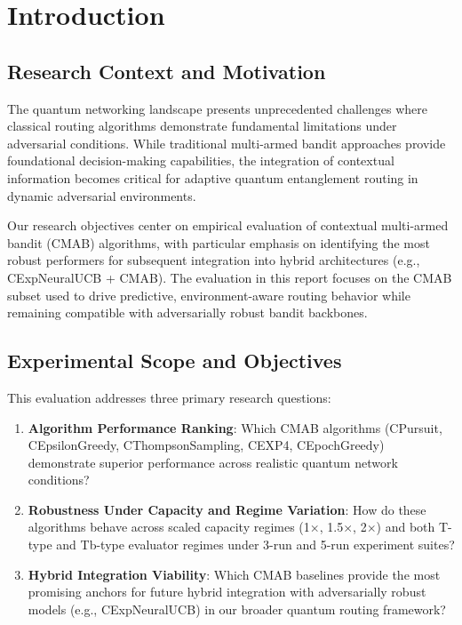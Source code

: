 \documentclass[12pt,a4paper]{article}
\begin{document}
\newpage
\section{Introduction}

\subsection{Research Context and Motivation}

The quantum networking landscape presents unprecedented challenges where classical routing algorithms demonstrate fundamental limitations under adversarial conditions. While traditional multi-armed bandit approaches provide foundational decision-making capabilities, the integration of contextual information becomes critical for adaptive quantum entanglement routing in dynamic adversarial environments.

Our research objectives center on empirical evaluation of contextual multi-armed bandit (CMAB) algorithms, with particular emphasis on identifying the most robust performers for subsequent integration into hybrid architectures (e.g., CExpNeuralUCB + CMAB). The evaluation in this report focuses on the CMAB subset used to drive predictive, environment-aware routing behavior while remaining compatible with adversarially robust bandit backbones.

\subsection{Experimental Scope and Objectives}

This evaluation addresses three primary research questions:

\begin{enumerate}
\item \textbf{Algorithm Performance Ranking}: Which CMAB algorithms (CPursuit, CEpsilonGreedy, CThompsonSampling, CEXP4, CEpochGreedy) demonstrate superior performance across realistic quantum network conditions?
\item \textbf{Robustness Under Capacity and Regime Variation}: How do these algorithms behave across scaled capacity regimes (1$\times$, 1.5$\times$, 2$\times$) and both T-type and Tb-type evaluator regimes under 3-run and 5-run experiment suites?
\item \textbf{Hybrid Integration Viability}: Which CMAB baselines provide the most promising anchors for future hybrid integration with adversarially robust models (e.g., CExpNeuralUCB) in our broader quantum routing framework?
\end{enumerate}
\end{document}
